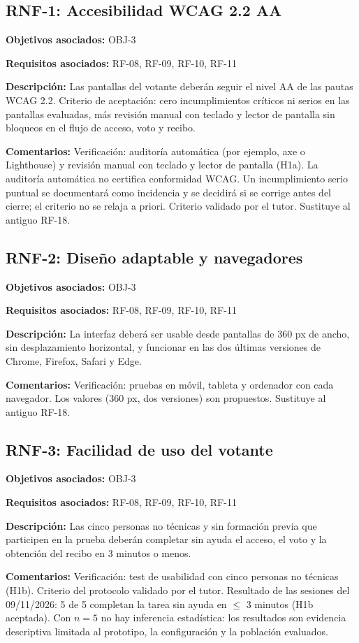 \subsection{RNF-1: Accesibilidad WCAG 2.2 AA}

\textbf{Objetivos asociados:} OBJ-3\par
\textbf{Requisitos asociados:} RF-08, RF-09, RF-10, RF-11\par
\textbf{Descripción:} Las pantallas del votante deberán seguir el nivel AA de las pautas WCAG 2.2. Criterio de aceptación: cero incumplimientos críticos ni serios en las pantallas evaluadas, más revisión manual con teclado y lector de pantalla sin bloqueos en el flujo de acceso, voto y recibo.\par
\textbf{Comentarios:} Verificación: auditoría automática (por ejemplo, axe o Lighthouse) y revisión manual con teclado y lector de pantalla (H1a). La auditoría automática no certifica conformidad WCAG. Un incumplimiento serio puntual se documentará como incidencia y se decidirá si se corrige antes del cierre; el criterio no se relaja a priori. Criterio validado por el tutor. Sustituye al antiguo RF-18.\par

\subsection{RNF-2: Diseño adaptable y navegadores}

\textbf{Objetivos asociados:} OBJ-3\par
\textbf{Requisitos asociados:} RF-08, RF-09, RF-10, RF-11\par
\textbf{Descripción:} La interfaz deberá ser usable desde pantallas de 360 px de ancho, sin desplazamiento horizontal, y funcionar en las dos últimas versiones de Chrome, Firefox, Safari y Edge.\par
\textbf{Comentarios:} Verificación: pruebas en móvil, tableta y ordenador con cada navegador. Los valores (360 px, dos versiones) son propuestos. Sustituye al antiguo RF-18.\par

\subsection{RNF-3: Facilidad de uso del votante}

\textbf{Objetivos asociados:} OBJ-3\par
\textbf{Requisitos asociados:} RF-08, RF-09, RF-10, RF-11\par
\textbf{Descripción:} Las cinco personas no técnicas y sin formación previa que participen en la prueba deberán completar sin ayuda el acceso, el voto y la obtención del recibo en 3 minutos o menos.\par
\textbf{Comentarios:} Verificación: test de usabilidad con cinco personas no técnicas (H1b). Criterio del protocolo validado por el tutor. Resultado de las sesiones del 09/11/2026: 5 de 5 completan la tarea sin ayuda en $\leq$ 3 minutos (H1b aceptada). Con $n = 5$ no hay inferencia estadística: los resultados son evidencia descriptiva limitada al prototipo, la configuración y la población evaluados.\par

